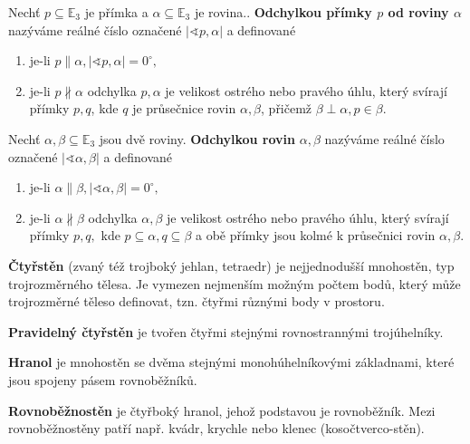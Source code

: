 \begin{definition}
    Nechť $p\subseteq \mathbb E_3$ je přímka a $\alpha\subseteq \mathbb E_3$ je
    rovina.. \textbf{Odchylkou přímky $p$ od roviny $\alpha$} nazýváme
    reálné číslo označené $|\sphericalangle
    p,\alpha|$ a definované
    \begin{enumerate}[$i.$]
    \item je-li $p\parallel \alpha, |\sphericalangle p,\alpha|=0^\circ,$
    \item je-li $p\nparallel \alpha$ odchylka $p,\alpha$ je velikost ostrého nebo
        pravého úhlu,
        který svírají přímky $p,q$, kde $q$ je průsečnice rovin $\alpha, \beta$,
        přičemž $\beta \perp \alpha, p\in\beta.$
    \end{enumerate}
\end{definition}

\begin{definition}
    Nechť $\alpha,\beta\subseteq \mathbb E_3$ jsou dvě roviny. \textbf{Odchylkou
    rovin} $\alpha, \beta$ nazýváme reálné číslo označené $|\sphericalangle
    \alpha, \beta|$ a definované
    \begin{enumerate}[$i.$]
    \item je-li $\alpha\parallel \beta, |\sphericalangle \alpha,\beta|=0^\circ,$
   	\item je-li $\alpha\nparallel \beta$ odchylka $\alpha,\beta$ je velikost
        ostrého nebo pravého úhlu,
        který svírají přímky $p,q,$ kde $p\subseteq \alpha, q\subseteq \beta$ a obě
        přímky jsou kolmé k průsečnici rovin $\alpha, \beta.$
    \end{enumerate}
\end{definition}

\begin{definition}
  \textbf{Čtyřstěn} (zvaný též trojboký jehlan, tetraedr) je nejjednodušší mnohostěn, typ trojrozměrného tělesa. Je vymezen nejmenším možným počtem bodů, který může trojrozměrné těleso definovat, tzn. čtyřmi různými body v prostoru.

  \textbf{Pravidelný čtyřstěn} je tvořen čtyřmi stejnými rovnostrannými trojúhelníky.
\end{definition}

\begin{definition}
  \textbf{Hranol} je mnohostěn se dvěma stejnými monohúhelníkovými základnami, které jsou spojeny pásem rovnoběžníků.
\end{definition}

\begin{definition}
  \textbf{Rovnoběžnostěn} je čtyřboký hranol, jehož podstavou je rovnoběžník. Mezi rovnoběžnostěny patří např. kvádr, krychle nebo klenec (kosočtverco-stěn).
\end{definition}


